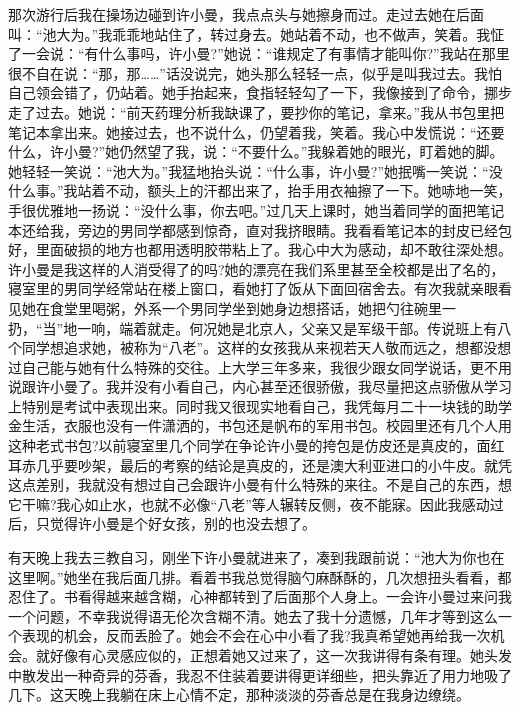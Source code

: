 \documentclass[12pt,oneside]{book}
\begin{document}
那次游行后我在操场边碰到许小曼，我点点头与她擦身而过。走过去她在后面叫：``池大为。''我乖乖地站住了，转过身去。她站着不动，也不做声，笑着。我怔了一会说：``有什么事吗，许小曼?''她说：``谁规定了有事情才能叫你?''我站在那里很不自在说：``那，那\ldots\ldots{}''话没说完，她头那么轻轻一点，似乎是叫我过去。我怕自己领会错了，仍站着。她手抬起来，食指轻轻勾了一下，我像接到了命令，挪步走了过去。她说：``前天药理分析我缺课了，要抄你的笔记，拿来。''我从书包里把笔记本拿出来。她接过去，也不说什么，仍望着我，笑着。我心中发慌说：``还要什么，许小曼?''她仍然望了我，说：``不要什么。''我躲着她的眼光，盯着她的脚。她轻轻一笑说：``池大为。''我猛地抬头说：``什么事，许小曼?''她抿嘴一笑说：``没什么事。''我站着不动，额头上的汗都出来了，抬手用衣袖擦了一下。她哧地一笑，手很优雅地一扬说：``没什么事，你去吧。''过几天上课时，她当着同学的面把笔记本还给我，旁边的男同学都感到惊奇，直对我挤眼睛。我看看笔记本的封皮已经包好，里面破损的地方也都用透明胶带粘上了。我心中大为感动，却不敢往深处想。许小曼是我这样的人消受得了的吗?她的漂亮在我们系里甚至全校都是出了名的，寝室里的男同学经常站在楼上窗口，看她打了饭从下面回宿舍去。有次我就亲眼看见她在食堂里喝粥，外系一个男同学坐到她身边想搭话，她把勺往碗里一扔，``当''地一响，端着就走。何况她是北京人，父亲又是军级干部。传说班上有八个同学想追求她，被称为``八老''。这样的女孩我从来视若天人敬而远之，想都没想过自己能与她有什么特殊的交往。上大学三年多来，我很少跟女同学说话，更不用说跟许小曼了。我并没有小看自己，内心甚至还很骄傲，我尽量把这点骄傲从学习上特别是考试中表现出来。同时我又很现实地看自己，我凭每月二十一块钱的助学金生活，衣服也没有一件潇洒的，书包还是帆布的军用书包。校园里还有几个人用这种老式书包?以前寝室里几个同学在争论许小曼的挎包是仿皮还是真皮的，面红耳赤几乎要吵架，最后的考察的结论是真皮的，还是澳大利亚进口的小牛皮。就凭这点差别，我就没有想过自己会跟许小曼有什么特殊的来往。不是自己的东西，想它干嘛?我心如止水，也就不必像``八老''等人辗转反侧，夜不能寐。因此我感动过后，只觉得许小曼是个好女孩，别的也没去想了。

有天晚上我去三教自习，刚坐下许小曼就进来了，凑到我跟前说：``池大为你也在这里啊。''她坐在我后面几排。看着书我总觉得脑勺麻酥酥的，几次想扭头看看，都忍住了。书看得越来越含糊，心神都转到了后面那个人身上。一会许小曼过来问我一个问题，不幸我说得语无伦次含糊不清。她去了我十分遗憾，几年才等到这么一个表现的机会，反而丢脸了。她会不会在心中小看了我?我真希望她再给我一次机会。就好像有心灵感应似的，正想着她又过来了，这一次我讲得有条有理。她头发中散发出一种奇异的芬香，我忍不住装着要讲得更详细些，把头靠近了用力地吸了几下。这天晚上我躺在床上心情不定，那种淡淡的芬香总是在我身边缭绕。
\end{document}
